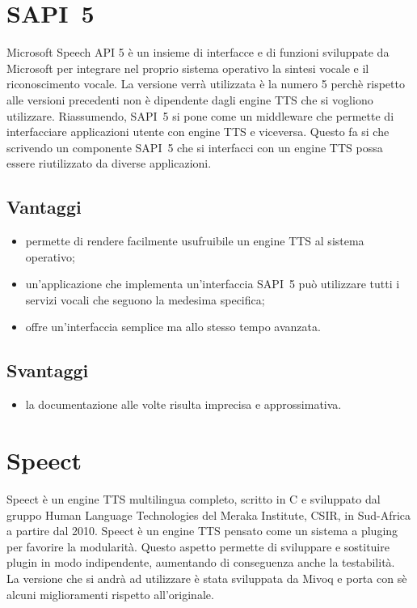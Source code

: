 \section{SAPI~5}
Microsoft Speech API 5 è un insieme di interfacce e di funzioni sviluppate da Microsoft per integrare nel proprio sistema operativo la sintesi vocale e il riconoscimento vocale. La versione verrà utilizzata è la numero 5 perchè rispetto alle versioni precedenti non è dipendente dagli engine TTS che si vogliono utilizzare. Riassumendo, SAPI~5 si pone come un middleware che permette di interfacciare applicazioni utente con engine TTS e viceversa. Questo fa si che scrivendo un componente SAPI~5 che si interfacci con un engine TTS possa essere riutilizzato da diverse applicazioni.
\subsection*{Vantaggi}
\begin{itemize}
	\item permette di rendere facilmente usufruibile un engine TTS al sistema operativo;
	\item un'applicazione che implementa un'interfaccia SAPI~5 può utilizzare tutti i servizi vocali che seguono la medesima specifica;
	\item offre un'interfaccia semplice ma allo stesso tempo avanzata.
\end{itemize}
\subsection*{Svantaggi}
\begin{itemize}
	\item la documentazione alle volte risulta imprecisa e approssimativa.
\end{itemize}
\section{Speect}
Speect è un engine TTS multilingua completo, scritto in C e sviluppato dal gruppo Human Language Technologies del Meraka Institute, CSIR, in Sud-Africa a partire dal 2010. Speect è un engine TTS pensato come un sistema a \gls{pluging} per favorire la modularità. Questo aspetto permette di sviluppare e sostituire plugin in modo indipendente, aumentando di conseguenza anche la testabilità.\\
La versione che si andrà ad utilizzare è stata sviluppata da Mivoq e porta con sè alcuni miglioramenti rispetto all'originale.
